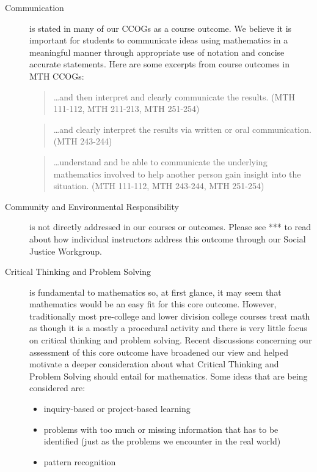 \begin{description}
\item[Communication] is stated in many of our CCOGs as a course outcome. We believe it is important for students to communicate ideas using mathematics in a meaningful manner through appropriate use of notation and concise accurate statements.  Here are some excerpts from course outcomes in MTH CCOGs: 
\begin{quote}
{\ldots}and then interpret and clearly communicate the results. (MTH 111-112, MTH 211-213, MTH 251-254)
\end{quote}

\begin{quote}
{\ldots}and clearly interpret the results via written or oral communication. (MTH 243-244)
\end{quote}

\begin{quote}
{\ldots}understand and be able to communicate the underlying mathematics involved to help another person gain insight into the situation. (MTH 111-112, MTH 243-244, MTH 251-254)
\end{quote}

\item[Community and Environmental Responsibility] is not directly addressed in our courses or outcomes. Please see *** to read about how individual instructors address this outcome through our Social Justice Workgroup. 

\item[Critical Thinking and Problem Solving] is fundamental to mathematics so, at first glance, it may seem that mathematics would be an easy fit for this core outcome.  However, traditionally most pre-college and lower division college courses treat math as though it is a mostly a procedural activity and there is very little focus on critical thinking and problem solving.  Recent discussions concerning our assessment of this core outcome have broadened our view and helped motivate a deeper consideration about what Critical Thinking and Problem Solving should entail for mathematics.  Some ideas that are being considered are:
\begin{itemize}
\item inquiry-based or project-based learning
\item problems with too much or missing information that has to be identified (just as the problems we encounter in the real world)
\item pattern recognition
\end{itemize}


\end{description}
